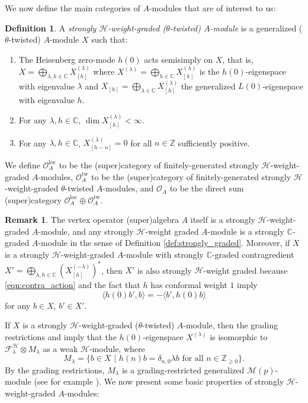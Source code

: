 \documentclass[11pt, reqno]{amsart}
\theoremstyle{definition}\newtheorem{defi}[thm]{Definition}
\theoremstyle{definition}\newtheorem{rem}[thm]{Remark}
\theoremstyle{definition}\newtheorem{exam}[thm]{Example}
\theoremstyle{definition}\newtheorem{assum}[thm]{Assumption}
\newcommand{\cH}{\mathcal{H}}
\newcommand{\cM}{\mathcal{M}}
\newcommand{\cF}{\mathcal{F}}
\newcommand{\cO}{\mathcal{O}}
\newcommand{\CC}{\mathbb{C}}
\newcommand{\ZZ}{\mathbb{Z}}
\newcommand{\Oloc}{\cO^{\mathrm{loc}}}
\newcommand{\Otw}{\cO^{\mathrm{tw}}}
\begin{document}
We now define the main categories of $A$-modules that are of interest to us:
\begin{defi}
 A \textit{strongly $\cH$-weight-graded ($\theta$-twisted) $A$-module} is a generalized ($\theta$-twisted) $A$-module $X$ such that:
 \begin{enumerate}
  \item The Heisenberg zero-mode $h(0)$ acts semisimply on $X$, that is, $X=\bigoplus_{\lambda,h\in\CC} X^{(\lambda)}_{[h]}$ where $X^{(\lambda)}=\bigoplus_{h\in\CC} X^{(\lambda)}_{[h]}$ is the $h(0)$-eigenspace with eigenvalue $\lambda$ and $X_{[h]}=\bigoplus_{{\lambda}\in\CC} X^{(\lambda)}_{[h]}$ the generalized $L(0)$-eigenspace with eigenvalue $h$.
  
  \item For any $\lambda,h\in\CC$, $\dim X^{(\lambda)}_{[h]}<\infty$.
  
  \item For any $\lambda, h\in\CC$, $X^{(\lambda)}_{[h-n]}=0$ for all $n\in\ZZ$ sufficiently positive.
 \end{enumerate}
 We define $\Oloc_A$ to be the (super)category of finitely-generated strongly $\cH$-weight-graded $A$-modules, $\Otw_A$ to be the (super)category of finitely-generated strongly $\cH$-weight-graded $\theta$-twisted $A$-modules, and $\cO_A$ to be the direct sum (super)category $\Oloc_A\oplus\Otw_A$.
\end{defi}

\begin{rem}\label{rem:strongly_H_or_C_graded}
 The vertex operator (super)algebra $A$ itself is a strongly $\cH$-weight-graded $A$-module, and any strongly $\cH$-weight graded $A$-module is a strongly $\CC$-graded $A$-module in the sense of Definition \ref{def:strongly_graded}. Moreover, if $X$ is a strongly $\cH$-weight-graded $A$-module with strongly $\CC$-graded contragredient $X'=\bigoplus_{\lambda,h\in\CC} (X_{[h]}^{(-\lambda)})^*$, then $X'$ is also strongly $\cH$-weight graded because \eqref{eqn:contra_action} and the fact that $h$ has conformal weight $1$ imply
 \begin{equation*}
 \langle h(0)b',b\rangle =-\langle b',h(0)b\rangle
 \end{equation*}
 for any $b\in X$, $b'\in X'$.
\end{rem}



If $X$ is a strongly $\cH$-weight-graded ($\theta$-twisted) $A$-module, then the grading restrictions and \cite[Theorem 1.7.3]{FLM} imply that the $h(0)$-eigenspace $X^{(\lambda)}$ is isomorphic to $\cF_\lambda^\cH\otimes M_\lambda$ as a weak $\cH$-module, where
\begin{equation*}
 M_\lambda=\lbrace b\in X\,\,\vert\,\,h(n)b=\delta_{n,0}\lambda b\,\,\text{for all}\,\,n\in\ZZ_{\geq 0}\rbrace.
\end{equation*}
By the grading restrictions, $M_\lambda$ is a grading-restricted generalized $\cM(p)$-module (see for example \cite[Theorem 2.6]{McR-cosets}). We now present some basic properties of strongly $\cH$-weight-graded $A$-modules:
\end{document}
